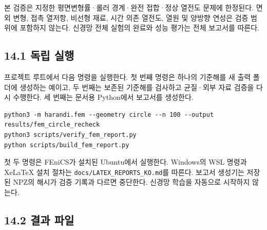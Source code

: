 \documentclass[10pt,a4paper]{article}
\begin{document}
본 검증은 지정한 평면변형률·롤러 경계·완전 접합·정상 열전도 문제에 한정된다. 면외 변형, 접촉 열저항, 비선형 재료, 시간 의존 열전도, 열원 및 양방향 연성은 검증 범위에 포함하지 않는다. 신경망 전체 실험의 완료와 성능 평가는 전체 보고서를 따른다.\par

\subsection{14.1 독립 실행}

프로젝트 루트에서 다음 명령을 실행한다. 첫 번째 명령은 하나의 기준해를 새 출력 폴더에 생성하는 예이고, 두 번째는 보존된 기준해를 검사하고 균질·외부 자료 검증을 다시 수행한다. 세 번째는 문서용 Python에서 보고서를 생성한다.\par

\begin{Verbatim}[fontsize=\small,breaklines=true,breakanywhere=true]
python3 -m harandi.fem --geometry circle --n 100 --output results/fem_circle_recheck
python3 scripts/verify_fem_report.py
python scripts/build_fem_report.py
\end{Verbatim}

첫 두 명령은 FEniCS가 설치된 Ubuntu에서 실행한다. Windows의 WSL 명령과 XeLaTeX 설치 절차는 \nolinkurl{docs/LATEX_REPORTS_KO.md}를 따른다. 보고서 생성기는 저장된 NPZ의 해시가 검증 기록과 다르면 중단한다. 신경망 학습을 자동으로 시작하지 않는다.\par

\subsection{14.2 결과 파일}

\begingroup\small
\end{document}
